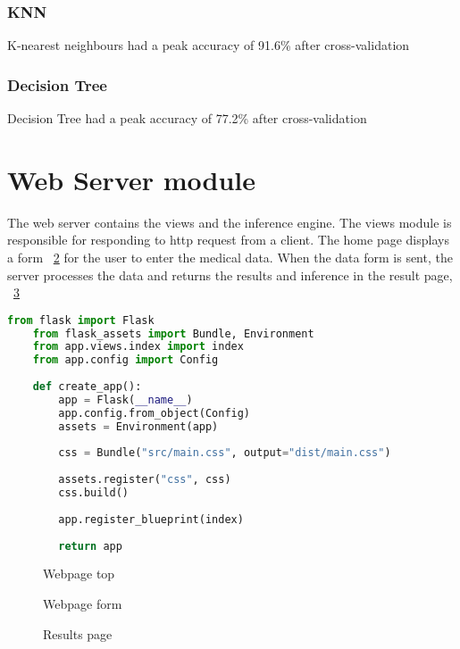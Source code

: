 \subsubsection{KNN}
K-nearest neighbours had a peak accuracy of 91.6\% after cross-validation

\subsubsection{Decision Tree}
Decision Tree had a peak accuracy of 77.2\% after cross-validation

\section{Web Server module}
The web server contains the views and the inference engine. The views module is responsible for responding to http request from a client. The home page displays a form \figurename~\ref{fig:site-2} for the user to enter the medical data. When the data form is sent, the server processes the data and returns the results and inference in the result page, \figurename~\ref{fig:site-3}

\begin{lstlisting}[language=Python, caption={app.py}, label={lst:app.py}]
	from flask import Flask
	from flask_assets import Bundle, Environment
	from app.views.index import index
	from app.config import Config
	
	def create_app():
		app = Flask(__name__)
		app.config.from_object(Config)
		assets = Environment(app)
		
		css = Bundle("src/main.css", output="dist/main.css")
		
		assets.register("css", css)
		css.build()
		
		app.register_blueprint(index)
		
		return app
\end{lstlisting}

\begin{figure}[htb]
	\centering
	\caption{Webpage top}
	\label{fig:site-1}
\end{figure}

\begin{figure}[htb]
	\centering
	\caption{Webpage form}
	\label{fig:site-2}
\end{figure}
\begin{figure}[htb]
	\centering
	\caption{Results page}
	\label{fig:site-3}
\end{figure}



